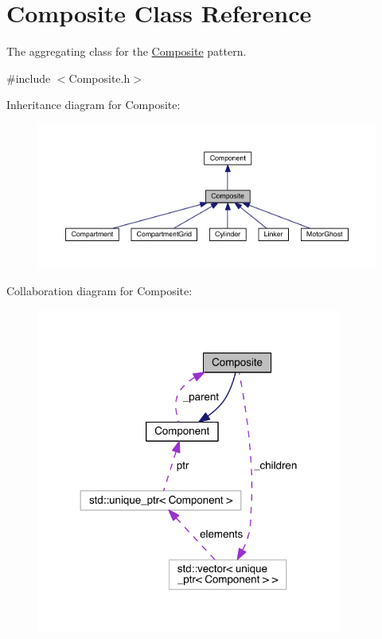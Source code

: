 \hypertarget{classComposite}{\section{Composite Class Reference}
\label{classComposite}
}


The aggregating class for the \hyperlink{classComposite}{Composite} pattern.  




{\ttfamily \#include $<$Composite.\+h$>$}



Inheritance diagram for Composite\+:\nopagebreak
\begin{figure}[H]
\begin{center}
\leavevmode
\includegraphics[width=350pt]{classComposite__inherit__graph}
\end{center}
\end{figure}


Collaboration diagram for Composite\+:\nopagebreak
\begin{figure}[H]
\begin{center}
\leavevmode
\includegraphics[width=284pt]{classComposite__coll__graph}
\end{center}
\end{figure}
